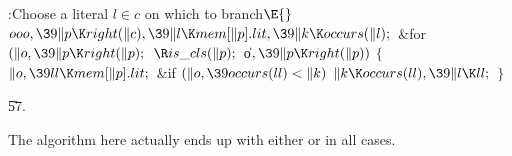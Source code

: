 \Y\B\4:Choose a literal $l\in c$ on which to branch\X${}\E{}$\6
$\\{ooo},\39\|p\K\\{right}(\|c),\39\|l\K\\{mem}[\|p].\\{lit},\39\|k\K%
\\{occurs}(\|l);{}$\6
\&{for} ${}(\|o,\39\|p\K\\{right}(\|p);{}$ ${}\R\\{is\_cls}(\|p);{}$ \|o${},\39%
\|p\K\\{right}(\|p)){}$\5
${}\{{}$\1\6
${}\|o,\39\\{ll}\K\\{mem}[\|p].\\{lit};{}$\6
\&{if} ${}(\|o,\39\\{occurs}(\\{ll})<\|k){}$\1\5
${}\|k\K\\{occurs}(\\{ll}),\39\|l\K\\{ll};{}$\2\6
\4${}\}{}$\2\par
\U57.\fi

The algorithm here actually ends up with either  or %
in all cases.

